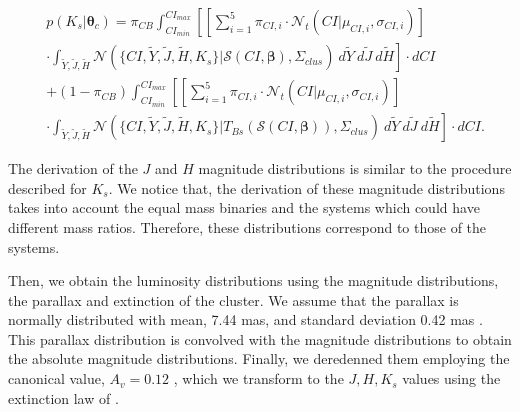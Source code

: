 \begin{align}
&p(K_s | \boldsymbol{\theta}_c)  =   \pi_{CB} \int_{CI_{min}}^{CI_{max}}\left[ \left[\sum_{i=1}^5 \pi_{CI,i} \cdot \mathcal{N}_t(CI| \mu_{CI,i},\sigma_{CI,i})\right]\right. \nonumber \\
&\cdot  \left.\int_{\tilde{Y},\tilde{J},\tilde{H}}\mathcal{N}(\{CI,\tilde{Y},\tilde{J},\tilde{H},K_s\}|\boldsymbol{\mathcal{S}}(CI, \boldsymbol{\beta}),\Sigma_{clus})~d\tilde{Y}~d\tilde{J}~d\tilde{H}\right] \cdot dCI \nonumber \\
& + (1-\pi_{CB}) \int_{CI_{min}}^{CI_{max}}\left[\left[\sum_{i=1}^5 \pi_{CI,i} \cdot \mathcal{N}_t(CI| \mu_{CI,i},\sigma_{CI,i})\right]\right.\nonumber\\
&\cdot \left. \int_{\tilde{Y},\tilde{J},\tilde{H}}\mathcal{N}(\{CI,\tilde{Y},\tilde{J},\tilde{H},K_s\}|T_{Bs}(\boldsymbol{\mathcal{S}}(CI, \boldsymbol{\beta})),\Sigma_{clus})~d\tilde{Y}~d\tilde{J}~d\tilde{H}\right]\cdot dCI. \nonumber 
\end{align}

The derivation of the $J$ and $H$ magnitude distributions is similar to the procedure described for $K_s$. We notice that, the derivation of these magnitude distributions takes into account the equal mass binaries and the systems which could have different mass ratios. Therefore, these distributions correspond to those of the systems. 

Then, we obtain the luminosity distributions using the magnitude distributions, the parallax and extinction of the cluster. We assume that the parallax is normally distributed with mean, 7.44 mas, and standard deviation 0.42 mas \citep{Galli2017}. This parallax distribution is convolved with the magnitude distributions to obtain the absolute magnitude distributions. Finally, we deredenned them employing the canonical value, $A_v=0.12$ \citep{Guthrie1987}, which we transform to the $J,H,K_s$ values using the extinction law of \citet{Cardelli1989}.

